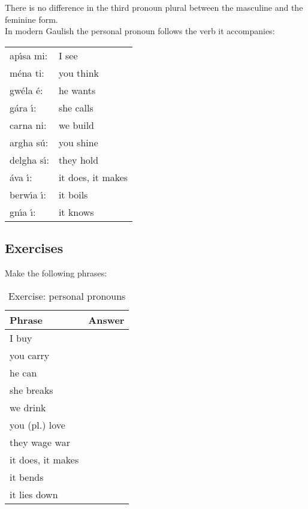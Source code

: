 \noindent There is no difference in the third pronoun plural between the masculine and the feminine form.\\

\noindent In modern Gaulish the personal pronoun follows the verb it accompanies:
\begin{table}[H]
\begin{tabu}{ll}
  ap\'{\i}sa mi: & I see\\
  m\'{e}na ti: & you think\\
  gw\'{e}la \'{e}: & he wants\\
  g\'{a}ra \'{\i}: & she calls\\
  carna ni: & we build\\
  argha s\'{u}: & you shine\\
  delgha s\'{\i}: & they hold\\
  \'{a}va \'{\i}: & it  does, it makes\\
  berw\'{\i}a \'{\i}: & it boils\\
  gn\'{\i}a \'{\i}: & it knows\\
\end{tabu}
\label{examples_personal_pronoun}
\end{table}

\subsection{Exercises}

\noindent Make the following phrases:\\
\begin{table}[H]
\begin{center}
\begin{tabu}{|l|p{10.0cm}|}
  \toprule
  \textbf{Phrase} & \textbf{Answer}\\
  \toprule
  I buy & \\
  \midrule
  you carry & \\
  \midrule
  he can & \\
  \midrule
  she breaks & \\
  \midrule
  we drink & \\
  \midrule
  you (pl.) love & \\
  \midrule
  they wage war & \\
  \midrule
  it does, it makes & \\
  \midrule
  it bends & \\
  \midrule
  it lies down & \\
  \bottomrule
\end{tabu}
\end{center}
\label{exercises_personal_pronouns}
\caption{Exercise: personal pronouns}
\end{table}
